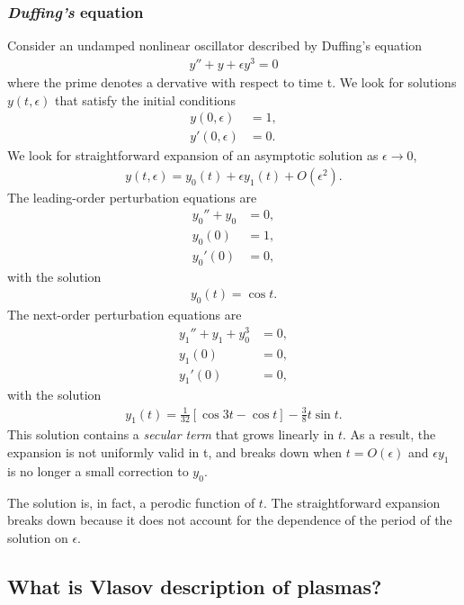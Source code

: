 \subsubsection{\emph{Duffing's} equation}
Consider an undamped nonlinear oscillator described by Duffing's equation 
\begin{align}
	y''+y+ \epsilon y^3 = 0
\end{align}
where the prime denotes a dervative with respect to time t. We look for solutions $y(t,\epsilon)$ that satisfy the initial conditions
\begin{align}
	y(0,\epsilon) &= 1, \\
	y'(0,\epsilon) &= 0.
\end{align}
We look for straightforward expansion of an asymptotic solution as $\epsilon \rightarrow 0$, 
\begin{align}
	y(t,\epsilon) = y_0(t) + \epsilon y_1(t) + O(\epsilon^2).
\end{align}
The leading-order perturbation equations are
\begin{align}
	y_0''+y_0 &= 0, \\
	y_0(0) &= 1, \\
	y_0'(0) &= 0,
\end{align}
with the solution
\begin{align}
	y_0(t) = \cos{t}.
\end{align}
The next-order perturbation equations are
\begin{align}
	y_1''+y_1+y_0^3 &= 0, \\
	y_1(0) &= 0, \\
	y_1'(0) &= 0, 
\end{align}
with the solution
\begin{align}
	y_1(t) = \frac{1}{32} \left[\cos{3t} - \cos{t} \right] - \frac{3}{8} t \sin{t}.
\end{align}
This solution contains a \textit{secular term} that grows linearly in $t$. As a result, the expansion is not uniformly valid in t, and breaks down when $t = O(\epsilon)$ and $\epsilon y_1$ is no longer a small correction to $y_0$.

The solution is, in fact, a perodic function of $t$. The straightforward expansion breaks down because it does not account for the dependence of the period of the solution on $\epsilon$. 

\subsection{What is Vlasov description of plasmas?}

